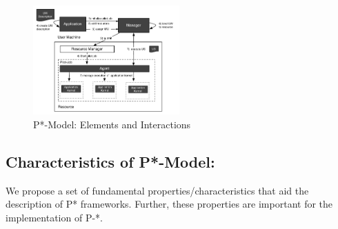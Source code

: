 \documentclass[conference,final]{IEEEtran}
\begin{document}
\begin{figure}[htbp]
    \centering    
    \includegraphics[width=0.5\textwidth]{figures/pstar_model.pdf}
    \caption{P*-Model: Elements and Interactions}
    \label{fig:figures_pstar}
\end{figure}    

% 
% 


\subsection{Characteristics of P*-Model:}
\label{sec:p_star_elements}

We propose a set of fundamental properties/characteristics that aid the 
description of P* frameworks. Further, these properties are important for the 
implementation of P-*.
\end{document}
